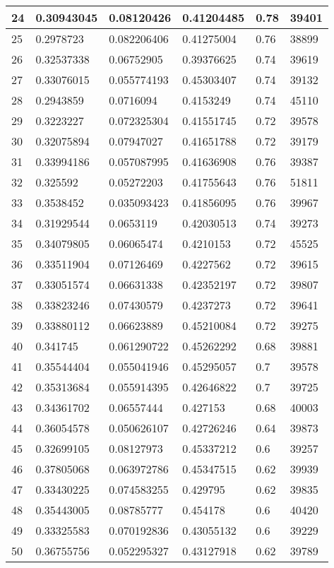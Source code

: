 \begin{longtable}{|l|l|l|l|l|l|}
24 & 0.30943045 & 0.08120426 & 0.41204485 & 0.78 & 39401 \\ \hline 
25 & 0.2978723 & 0.082206406 & 0.41275004 & 0.76 & 38899 \\ \hline 
26 & 0.32537338 & 0.06752905 & 0.39376625 & 0.74 & 39619 \\ \hline 
27 & 0.33076015 & 0.055774193 & 0.45303407 & 0.74 & 39132 \\ \hline 
28 & 0.2943859 & 0.0716094 & 0.4153249 & 0.74 & 45110 \\ \hline 
29 & 0.3223227 & 0.072325304 & 0.41551745 & 0.72 & 39578 \\ \hline 
30 & 0.32075894 & 0.07947027 & 0.41651788 & 0.72 & 39179 \\ \hline 
31 & 0.33994186 & 0.057087995 & 0.41636908 & 0.76 & 39387 \\ \hline 
32 & 0.325592 & 0.05272203 & 0.41755643 & 0.76 & 51811 \\ \hline 
33 & 0.3538452 & 0.035093423 & 0.41856095 & 0.76 & 39967 \\ \hline 
34 & 0.31929544 & 0.0653119 & 0.42030513 & 0.74 & 39273 \\ \hline 
35 & 0.34079805 & 0.06065474 & 0.4210153 & 0.72 & 45525 \\ \hline 
36 & 0.33511904 & 0.07126469 & 0.4227562 & 0.72 & 39615 \\ \hline 
37 & 0.33051574 & 0.06631338 & 0.42352197 & 0.72 & 39807 \\ \hline 
38 & 0.33823246 & 0.07430579 & 0.4237273 & 0.72 & 39641 \\ \hline 
39 & 0.33880112 & 0.06623889 & 0.45210084 & 0.72 & 39275 \\ \hline 
40 & 0.341745 & 0.061290722 & 0.45262292 & 0.68 & 39881 \\ \hline 
41 & 0.35544404 & 0.055041946 & 0.45295057 & 0.7 & 39578 \\ \hline 
42 & 0.35313684 & 0.055914395 & 0.42646822 & 0.7 & 39725 \\ \hline 
43 & 0.34361702 & 0.06557444 & 0.427153 & 0.68 & 40003 \\ \hline 
44 & 0.36054578 & 0.050626107 & 0.42726246 & 0.64 & 39873 \\ \hline 
45 & 0.32699105 & 0.08127973 & 0.45337212 & 0.6 & 39257 \\ \hline 
46 & 0.37805068 & 0.063972786 & 0.45347515 & 0.62 & 39939 \\ \hline 
47 & 0.33430225 & 0.074583255 & 0.429795 & 0.62 & 39835 \\ \hline 
48 & 0.35443005 & 0.08785777 & 0.454178 & 0.6 & 40420 \\ \hline 
49 & 0.33325583 & 0.070192836 & 0.43055132 & 0.6 & 39229 \\ \hline 
50 & 0.36755756 & 0.052295327 & 0.43127918 & 0.62 & 39789 \\ \hline 
\end{longtable}